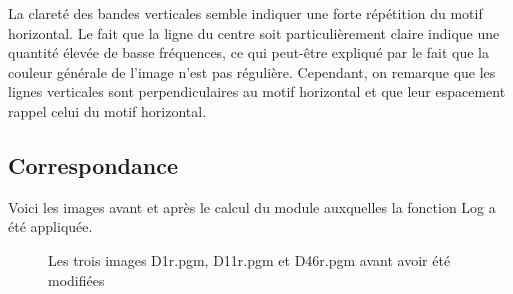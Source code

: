 \documentclass[12pt]{article}
\begin{document}
La clareté des bandes verticales semble indiquer une forte répétition du motif horizontal. Le fait que la ligne du centre soit particulièrement claire indique une quantité élevée de basse fréquences, ce qui peut-être expliqué par le fait que la couleur générale de l'image n'est pas régulière. Cependant, on remarque que les lignes verticales sont perpendiculaires au motif horizontal et que leur espacement rappel celui du motif horizontal.

\pagebreak

\subsection{Correspondance}
Voici les images avant et après le calcul du module auxquelles la fonction Log a été appliquée.
\begin{figure}[ht]
  \centering
  \hspace{0.5cm}
  \hspace{0.5cm}
  \captionsetup{width=.8\linewidth}
  \caption{Les trois images D1r.pgm, D11r.pgm et D46r.pgm avant avoir été modifiées}
\end{figure}
\end{document}
